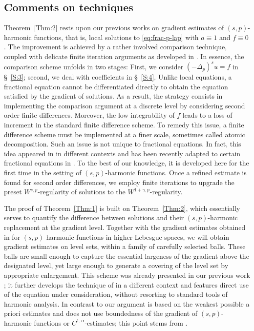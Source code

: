 \documentclass[10pt,letterpaper]{amsart}
\theoremstyle{definition}
\numberwithin{theorem}{section}
\numberwithin{equation}{section}
\newcommand{\1}{\ensuremath{\mathds{1}}}
\numberwithin{equation}{section}
\begin{document}
\subsection{Comments on techniques}
Theorem~\ref{Thm:2} rests upon our previous works \cite{BDLMS-1, BDLMS-2} on gradient estimates of $(s,p)$-harmonic functions, that is, local solutions to \eqref{eq:frac-p-lap} with $a\equiv1$ and $f\equiv0$. 
The improvement is achieved by a rather involved comparison technique, coupled with delicate finite iteration arguments as developed in \cite{BDLMS-1, BDLMS-2}. In essence, the comparison scheme unfolds in two stages: First, we consider $(-\Delta_p)^s u=f$ in \S~\ref{S:3}; second, we deal with coefficients in \S~\ref{S:4}. Unlike local equations, a fractional equation cannot be differentiated directly to obtain the equation satisfied by the gradient of solutions. As a result, the strategy consists in implementing the comparison argument at a discrete level by considering second order finite differences. Moreover, the low integrability of $f$ leads to a loss of increment in the standard finite difference scheme. To remedy this issue, a finite difference scheme must be implemented at a finer scale, sometimes called atomic decomposition. Such an issue is not unique to fractional equations. In fact, this idea appeared in \cite{DuMinKr, Kri-Min:05, Kri-Min:06, Min-07, Min-11, AKM-18, DM-23} in different contexts and has been recently adapted to certain fractional equations in \cite{DKLN-pot, KNS-22}. To the best of our knowledge, it is developed here for the first time in the setting of $(s,p)$-harmonic functions. Once a refined estimate is found for second order differences, we employ finite iterations to upgrade the preset $W^{s,p}$-regularity of solutions to the $W^{1+\gamma,p}$-regularity.

The proof of Theorem~\ref{Thm:1} is built on Theorem~\ref{Thm:2}, which  essentially serves to quantify the difference between solutions and their $(s,p)$-harmonic replacement at the gradient level. Together with the gradient estimates obtained in \cite{BDLMS-1, BDLMS-2} for $(s,p)$-harmonic functions in higher Lebesgue spaces, we will obtain gradient estimates on level sets, within a family of carefully selected balls. These balls are small enough to capture the essential largeness of the gradient above the designated level, yet large enough to generate a covering of the level set by appropriate enlargement.  This scheme was already  presented in our previous work \cite{BDLM}; it further develops the technique of \cite{AcMi, Acerbi-Min, CP-98} in a different context and features direct use of the equation under consideration, without resorting to standard tools of harmonic analysis. In contrast to \cite{AcMi, Acerbi-Min} our argument is based on the weakest possible a priori estimates and does not use boundedness of the gradient of $(s,p)$-harmonic functions or $C^{1,\alpha}$-estimates; this point stems from \cite{DuMinSt, Kri-Min:06}. 
\end{document}
